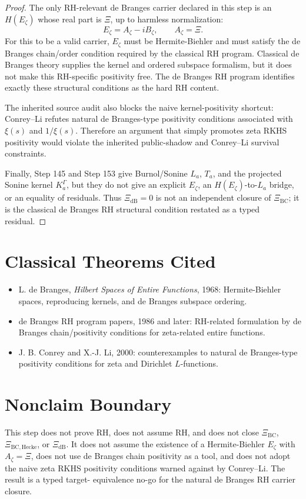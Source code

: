 \documentclass[11pt]{article}
\newcommand{\dB}{\mathrm{dB}}
\newcommand{\XiBC}{\Xi_{\mathrm{BC}}}
\newcommand{\XiHecke}{\Xi_{\mathrm{BC,Hecke}}}
\newcommand{\XidB}{\Xi_{\dB}}
\begin{document}
\begin{proof}
The only RH-relevant de Branges carrier declared in this step is an
\(H(E_\zeta)\) whose real part is \(\Xi\), up to harmless normalization:
\[
E_\zeta=A_\zeta-iB_\zeta,\qquad A_\zeta=\Xi.
\]
For this to be a valid carrier, \(E_\zeta\) must be Hermite-Biehler and must
satisfy the de Branges chain/order condition required by the classical RH
program.  Classical de Branges theory supplies the kernel and ordered
subspace formalism, but it does not make this RH-specific positivity free.
The de Branges RH program identifies exactly these structural conditions as
the hard RH content.

The inherited source audit also blocks the naive kernel-positivity shortcut:
Conrey--Li refutes natural de Branges-type positivity conditions associated
with \(\xi(s)\) and \(1/\xi(s)\).  Therefore an argument that simply promotes
zeta RKHS positivity would violate the inherited public-shadow and
Conrey--Li survival constraints.

Finally, Step 145 and Step 153 give Burnol/Sonine \(L_a\), \(T_a\), and the
projected Sonine kernel \(K_a^\Gamma\), but they do not give an explicit
\(E_\zeta\), an \(H(E_\zeta)\)-to-\(L_a\) bridge, or an equality of residuals.
Thus \(\XidB=0\) is not an independent closure of \(\XiBC\); it is the
classical de Branges RH structural condition restated as a typed residual.
\end{proof}

\section*{Classical Theorems Cited}

\begin{itemize}
\item L. de Branges, \emph{Hilbert Spaces of Entire Functions}, 1968:
Hermite-Biehler spaces, reproducing kernels, and de Branges subspace ordering.
\item de Branges RH program papers, 1986 and later: RH-related formulation by
de Branges chain/positivity conditions for zeta-related entire functions.
\item J. B. Conrey and X.-J. Li, 2000: counterexamples to natural
de Branges-type positivity conditions for zeta and Dirichlet \(L\)-functions.
\end{itemize}

\section*{Nonclaim Boundary}

This step does not prove RH, does not assume RH, and does not close
\(\XiBC\), \(\XiHecke\), or \(\XidB\).  It does not assume the existence of a
Hermite-Biehler \(E_\zeta\) with \(A_\zeta=\Xi\), does not use de Branges
chain positivity as a tool, and does not adopt the naive zeta RKHS positivity
conditions warned against by Conrey--Li.  The result is a typed target-
equivalence no-go for the natural de Branges RH carrier closure.
\end{document}
